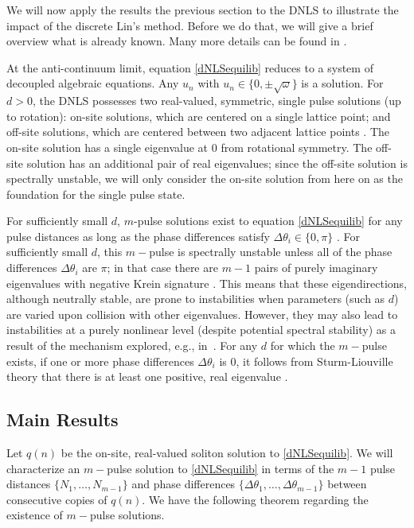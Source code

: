 \documentclass[12pt]{article}
\begin{document}
We will now apply the results the previous section to the 
DNLS to illustrate the impact of the discrete Lin's method. Before we do that, we will give a brief overview what is already known. Many more details can be found in \cite{Kevrekidis2009,pelinovsky_2011}. 

At the anti-continuum limit, equation \eqref{dNLSequilib} reduces to a system of decoupled algebraic equations. Any $u_n$ with $u_n \in \{ 0, \pm \sqrt{\omega}\}$ is a solution. For $d > 0$, the DNLS possesses two real-valued, symmetric, single pulse solutions (up to rotation): on-site solutions, which are centered on a single lattice point; and off-site solutions, which are centered between two adjacent lattice points \cite{Kevrekidis2009}. The on-site solution has a single eigenvalue at 0 from rotational symmetry. The off-site solution has an additional pair of real eigenvalues; since the off-site solution is spectrally unstable, we will only consider the on-site solution from here on as the foundation for the 
single pulse state. 

For sufficiently small $d$, $m$-pulse solutions exist to equation \eqref{dNLSequilib} for any pulse distances as long as the phase differences satisfy $\Delta \theta_i \in \{0, \pi\}$ \cite[Proposition 2.1]{Pelinovsky2005}. For sufficiently small $d$, this $m-$pulse is spectrally unstable unless all of the phase differences $\Delta \theta_i$ are $\pi$; in that case there are $m-1$ pairs of purely imaginary eigenvalues with negative Krein signature \cite[Theorem 3.6]{Pelinovsky2005}.
This means that these eigendirections, although neutrally
stable, are prone to instabilities when parameters 
(such as $d$) are varied upon collision with other
eigenvalues. However, they may also lead to instabilities
at a purely nonlinear level (despite potential spectral
stability) as a result of the mechanism explored, e.g.,
in~\cite{CUCCAGNA200938,PRL_2015}.
For any $d$ for which the $m-$pulse exists, if one or more phase differences $\Delta \theta_i$ is 0, it follows from Sturm-Liouville theory that there is at least one positive, real eigenvalue \cite{Kapitula2001a}.

\subsection{Main Results}

Let $q(n)$ be the on-site, real-valued soliton solution to \eqref{dNLSequilib}. We will characterize an $m-$pulse solution to \eqref{dNLSequilib} in terms of the $m-1$ pulse distances $\{ N_1, \dots, N_{m-1} \}$ and phase differences $\{ \Delta\theta_1, \dots, \Delta\theta_{m-1} \}$ between consecutive copies of $q(n)$. We have the following theorem regarding the existence of $m-$pulse solutions.
\end{document}
